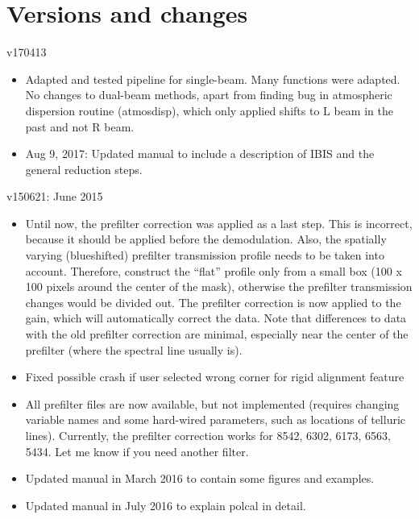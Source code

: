\documentclass[a4paper,11pt]{article}
\begin{document}
%




\section{Versions and changes}

v170413
\begin{itemize}
\item Adapted and tested pipeline for single-beam. Many functions were adapted. No changes to dual-beam methods, apart from finding bug in atmospheric dispersion routine (atmosdisp), which only applied shifts to L beam in the past and not R beam.
\item Aug 9, 2017: Updated manual to include a description of IBIS and the general reduction steps.
\end{itemize}


v150621: June 2015
\begin{itemize}
\item Until now, the prefilter correction was applied as a last step. This is incorrect, because it should be applied before the demodulation. Also, the spatially varying (blueshifted) prefilter transmission profile needs to be taken into account. Therefore, construct the ``flat'' profile only from a small box (100 x 100 pixels around the center of the mask), otherwise the prefilter transmission changes would be divided out. The prefilter correction is now applied to the gain, which will automatically correct the data. Note that differences to data with the old prefilter correction are minimal, especially near the center of the prefilter (where the spectral line usually is).
\item Fixed possible crash if user selected wrong corner for rigid alignment feature
\item All prefilter files are now available, but not implemented (requires changing variable names and some hard-wired parameters, such as locations of telluric lines). Currently, the prefilter correction works for 8542, 6302, 6173, 6563, 5434. Let me know if you need another filter.
\item Updated manual in March 2016 to contain some figures and examples.
\item Updated manual in July 2016 to explain polcal in detail.
\end{itemize}
\end{document}
